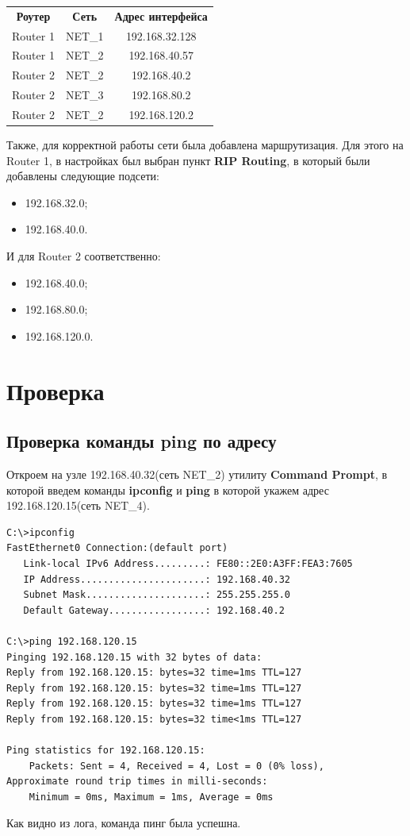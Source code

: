 \documentclass[14pt,a4paper,report]{report}
\begin{document}
\begin{center}
\begin{tabular}{ c c c }
\textbf{Роутер}&\textbf{Сеть}&\textbf{Адрес интерфейса}\\  
Router 1&NET\_1&192.168.32.128\\ 
Router 1&NET\_2&192.168.40.57\\ 
Router 2&NET\_2&192.168.40.2\\ 
Router 2&NET\_3&192.168.80.2\\ 
Router 2&NET\_2&192.168.120.2\\ 
\end{tabular}
\end{center}


Также, для корректной работы сети была добавлена маршрутизация. Для этого на Router 1, в настройках был выбран пункт \textbf{RIP Routing}, в который были добавлены следующие подсети:
\begin{itemize}
\item 192.168.32.0;
\item 192.168.40.0.
\end{itemize}
И для Router 2 соответственно:
\begin{itemize}
\item 192.168.40.0;
\item 192.168.80.0;
\item 192.168.120.0.
\end{itemize}

\section{Проверка}
\subsection{Проверка команды ping по адресу}
Откроем на узле 192.168.40.32(сеть NET\_2) утилиту \textbf{Command Prompt}, в которой введем команды \textbf{ipconfig} и \textbf{ping} в которой укажем адрес 192.168.120.15(сеть NET\_4).
\begin{lstlisting}[language={}]
C:\>ipconfig
FastEthernet0 Connection:(default port)
   Link-local IPv6 Address.........: FE80::2E0:A3FF:FEA3:7605
   IP Address......................: 192.168.40.32
   Subnet Mask.....................: 255.255.255.0
   Default Gateway.................: 192.168.40.2

C:\>ping 192.168.120.15
Pinging 192.168.120.15 with 32 bytes of data:
Reply from 192.168.120.15: bytes=32 time=1ms TTL=127
Reply from 192.168.120.15: bytes=32 time=1ms TTL=127
Reply from 192.168.120.15: bytes=32 time=1ms TTL=127
Reply from 192.168.120.15: bytes=32 time<1ms TTL=127

Ping statistics for 192.168.120.15:
    Packets: Sent = 4, Received = 4, Lost = 0 (0% loss),
Approximate round trip times in milli-seconds:
    Minimum = 0ms, Maximum = 1ms, Average = 0ms
\end{lstlisting}
Как видно из лога, команда пинг была успешна.
\end{document}
